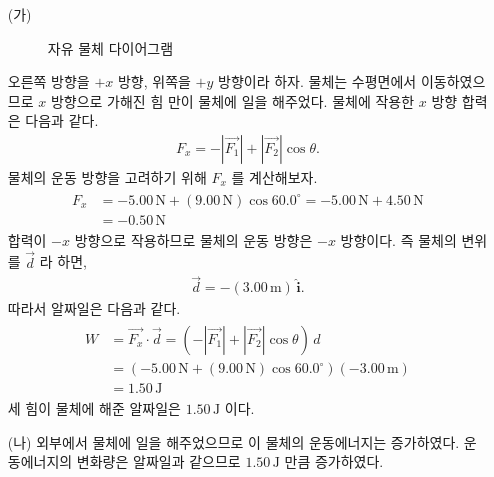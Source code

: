 \documentclass[floatfix,nofootinbib,superscriptaddress,fleqn]{revtex4-2}
\begin{document}
\begin{itemize}
  \item [(가)] 
  \begin{figure}
     \caption{자유 물체 다이어그램}
  \end{figure}
 오른쪽 방향을 $+x$ 방향, 위쪽을 $+y$ 방향이라 하자. 
 물체는 수평면에서 이동하였으므로 $x$ 방향으로 가해진 힘 만이 물체에 일을 해주었다. 
 물체에 작용한 $x$ 방향 합력은 다음과 같다.
 \begin{align}
   F_x = -|\vec{F_1}|+|\vec{F_2}|\cos{\theta}.
 \end{align}
 물체의 운동 방향을 고려하기 위해 $F_x$ 를 계산해보자.
 \begin{align}
  \begin{split}
    F_x &= -5.00\,\mathrm{N}+(9.00\,\mathrm{N})\cos{60.0^\circ}
    = -5.00\,\mathrm{N}+4.50\,\mathrm{N} \\
    &= -0.50\,\mathrm{N}
  \end{split}
 \end{align}
 합력이 $-x$ 방향으로 작용하므로 물체의 운동 방향은 $-x$ 방향이다. 즉 
 물체의 변위를 $\vec{d}$ 라 하면,
 \begin{align}\label{eq:3-1}
   \vec{d} = -(3.00\,\mathrm{m})\,\hat{\bm{i}}.
 \end{align} 
 따라서 알짜일은 다음과 같다.
 \begin{align}
  \begin{split}
    W &= \vec{F_x}\cdot\vec{d}= \left(-|\vec{F_1}|+|\vec{F_2}|\cos{\theta}\right)\,d \\
    &= \left(-5.00\,\mathrm{N}+(9.00\,\mathrm{N})\cos{60.0^\circ}\right)
    (-3.00\,\mathrm{m})  \\
    &= 1.50\,\mathrm{J}
  \end{split}
 \end{align}
 세 힘이 물체에 해준 알짜일은 $1.50\,\mathrm{J}$ 이다.
  \item [(나)] 외부에서 물체에 일을 해주었으므로 이 물체의 운동에너지는 
  증가하였다. 운동에너지의 변화량은 알짜일과 같으므로 $1.50\,\mathrm{J}$ 
  만큼 증가하였다.
\end{itemize}
\end{document}
